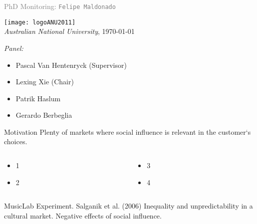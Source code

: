 

{%
\begin{frame}[c]%
\begin{center}
	
	\vspace{10em}
	\footnotesize\textcolor{gray}{PhD Monitoring: 	\texttt{Felipe Maldonado}}
	\vspace{.5em}
	
	
	\texttt{[image: logoANU2011]}\\
	\textcolor{anugold}{\textit{Australian National University}, \today}

\end{center}
\end{frame}
}

{
\begin{frame}[c]


\vspace{7em}
\textcolor{anugold}{\textit{Panel:}}
\begin{itemize}
\item Pascal Van Hentenryck (Supervisor) 
\item Lexing Xie (Chair)
\item Patrik Haslum
\item Gerardo Berbeglia
\end{itemize}
\end{frame}
}

\begin{frame}[c]{Motivation}{}
	Plenty of markets where social influence is relevant in the customer`s choices. 
	\begin{columns}[t]
	\begin{column}[T]{5.5cm}
		\begin{itemize}
			\item 1
			\item 2		
		\end{itemize}
	\end{column}
	
	\begin{column}[T]{5.5cm}
		\begin{itemize}
			\item 3
			\item 4		
		\end{itemize}
	\end{column}
	\end{columns}
	\begin{alertblock}{MusicLab Experiment. Salganik et al. (2006)}
		Inequality and unpredictability in a cultural market. Negative effects of social influence.
	\end{alertblock}
	\end{frame}
	

